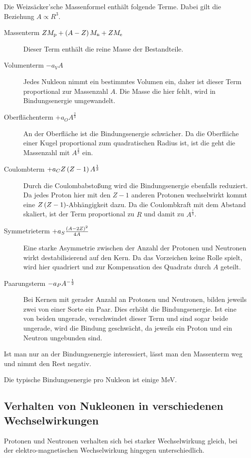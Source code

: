 Die Weizsäcker'sche Massenformel enthält folgende Terme. Dabei gilt die
Beziehung $A \propto R^3$.
\begin{description}
    \item[Massenterm $ZM_\text{p}+\del{A-Z}M_\text{n}+ZM_\text{e}$]
        Dieser Term enthält die reine Masse der Bestandteile.
    \item[Volumenterm $-a_VA$]
        Jedes Nukleon nimmt ein bestimmtes Volumen ein, daher ist dieser Term
        proportional zur Massenzahl $A$. Die Masse die hier fehlt, wird in
        Bindungsenergie umgewandelt.
    \item[Oberflächenterm $+a_OA^{\frac23}$]
        An der Oberfläche ist die Bindungsenergie schwächer. Da die Oberfläche
        einer Kugel proportional zum quadratischen Radius ist, ist die geht die
        Massenzahl mit $A^{\frac23}$ ein.
    \item[Coulombterm $+a_CZ\del{Z-1}A^{\frac13}$]
        Durch die Coulombabstoßung wird die Bindungsenergie ebenfalls
        reduziert. Da jedes Proton hier mit den $Z-1$ anderen Protonen
        wechselwirkt kommt eine $Z\del{Z-1}$-Abhängigkeit dazu. Da die
        Coulombkraft mit dem Abstand skaliert, ist der Term proportional zu $R$
        und damit zu $A^{\frac13}$.
    \item[Symmetrieterm $+a_S\frac{\del{A-2Z}^2}{4A}$]
        Eine starke Asymmetrie zwischen der Anzahl der Protonen und Neutronen
        wirkt destabilisierend auf den Kern. Da das Vorzeichen keine Rolle
        spielt, wird hier quadriert und zur Kompensation des Quadrats durch $A$
        geteilt.
    \item[Paarungsterm $-a_PA^{-\frac 12}$]
        Bei Kernen mit gerader Anzahl an Protonen und Neutronen, bilden jeweils
        zwei von einer Sorte ein Paar. Dies erhöht die Bindungsenergie. Ist
        eine von beiden ungerade, verschwindet dieser Term und sind sogar beide
        ungerade, wird die Bindung geschwächt, da jeweils ein Proton und ein
        Neutron ungebunden sind.
\end{description}
Ist man nur an der Bindungsenergie interessiert, lässt man den Massenterm weg und nimmt den Rest negativ.

Die typische Bindungsenergie pro Nukleon ist einige \si{\mega\electronvolt}.

\subsection{Verhalten von Nukleonen in verschiedenen Wechselwirkungen}

Protonen und Neutronen verhalten sich bei starker Wechselwirkung gleich, bei der elektro-magnetischen Wechselwirkung hingegen unterschiedlich.

